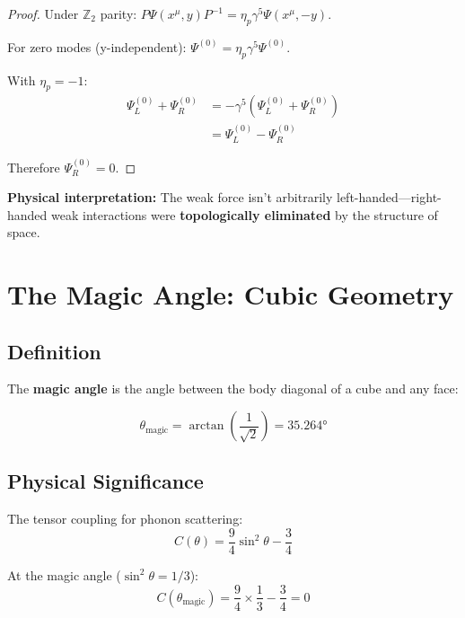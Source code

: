 \documentclass[12pt,a4paper]{article}
\newcommand{\Ztwo}{\mathbb{Z}_2}
\begin{document}
\begin{proof}
Under $\Ztwo$ parity: $P\Psi(x^\mu, y)P^{-1} = \eta_p \gamma^5 \Psi(x^\mu, -y)$.

For zero modes (y-independent): $\Psi^{(0)} = \eta_p \gamma^5 \Psi^{(0)}$.

With $\eta_p = -1$:
\begin{align}
\Psi_L^{(0)} + \Psi_R^{(0)} &= -\gamma^5(\Psi_L^{(0)} + \Psi_R^{(0)}) \\
&= \Psi_L^{(0)} - \Psi_R^{(0)}
\end{align}

Therefore $\Psi_R^{(0)} = 0$.
\end{proof}

\textbf{Physical interpretation:} The weak force isn't arbitrarily left-handed---right-handed weak interactions were \textbf{topologically eliminated} by the structure of space.

\section{The Magic Angle: Cubic Geometry}
\label{sec:magic}

\subsection{Definition}

The \textbf{magic angle} is the angle between the body diagonal of a cube and any face:

\begin{equation}
\boxed{\theta_{\text{magic}} = \arctan\left(\frac{1}{\sqrt{2}}\right) = 35.264°}
\end{equation}

\subsection{Physical Significance}

The tensor coupling for phonon scattering:
\begin{equation}
C(\theta) = \frac{9}{4}\sin^2\theta - \frac{3}{4}
\end{equation}

At the magic angle ($\sin^2\theta = 1/3$):
\begin{equation}
C(\theta_{\text{magic}}) = \frac{9}{4} \times \frac{1}{3} - \frac{3}{4} = 0
\end{equation}
\end{document}

